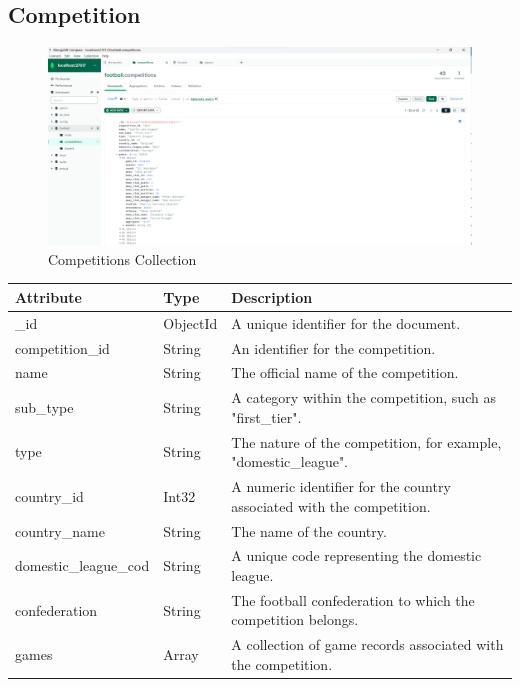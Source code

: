 \documentclass{Configuration_Files/PoliMi3i_thesis}
\begin{document}
\subsection{Competition}
\begin{figure}[htbp]
    \centering
    \includegraphics[scale=0.45]{Images/Dataset/competitions.png}
    \caption{Competitions Collection}
\end{figure}
\begin{tabular}{|l|l|p{8cm}|}
    \hline
    \textbf{Attribute}            & \textbf{Type}           & \textbf{Description} \\ \hline
    \_id                          & ObjectId                & A unique identifier for the document. \\ \hline
    competition\_id               & String                  & An identifier for the competition. \\ \hline
    name                          & String                  & The official name of the competition. \\ \hline
    sub\_type                     & String                  & A category within the competition, such as "first\_tier". \\ \hline
    type                          & String                  & The nature of the competition, for example, "domestic\_league". \\ \hline
    country\_id                   & Int32                   & A numeric identifier for the country associated with the competition. \\ \hline
    country\_name                 & String                  & The name of the country. \\ \hline
    domestic\_league\_cod         & String                  & A unique code representing the domestic league. \\ \hline
    confederation                 & String                  & The football confederation to which the competition belongs. \\ \hline
    games                         & Array                   & A collection of game records associated with the competition. \\ \hline
\end{tabular}
\end{document}
